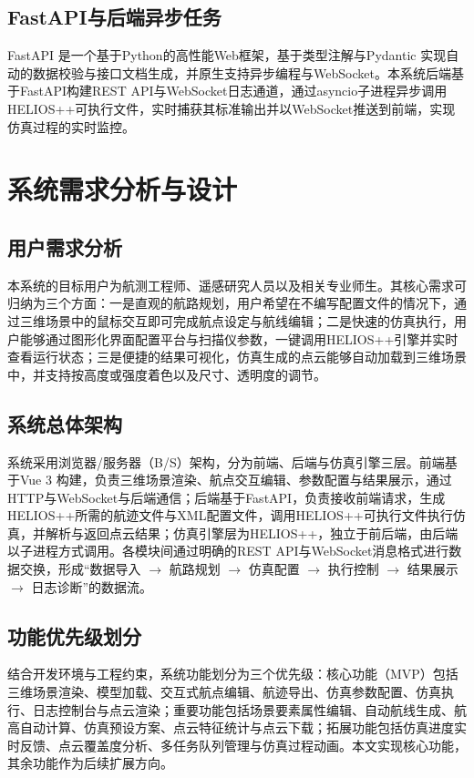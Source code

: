 \documentclass[a4paper,fleqn]{cas-sc}
\begin{document}
\subsection{FastAPI与后端异步任务}
FastAPI \citep{fastapi}是一个基于Python的高性能Web框架，基于类型注解与Pydantic \citep{pydantic} 实现自动的数据校验与接口文档生成，并原生支持异步编程与WebSocket。本系统后端基于FastAPI构建REST API与WebSocket日志通道，通过asyncio子进程异步调用HELIOS++可执行文件，实时捕获其标准输出并以WebSocket推送到前端，实现仿真过程的实时监控。

\section{系统需求分析与设计}\label{sec:design}
\subsection{用户需求分析}
本系统的目标用户为航测工程师、遥感研究人员以及相关专业师生。其核心需求可归纳为三个方面：一是直观的航路规划，用户希望在不编写配置文件的情况下，通过三维场景中的鼠标交互即可完成航点设定与航线编辑；二是快速的仿真执行，用户能够通过图形化界面配置平台与扫描仪参数，一键调用HELIOS++引擎并实时查看运行状态；三是便捷的结果可视化，仿真生成的点云能够自动加载到三维场景中，并支持按高度或强度着色以及尺寸、透明度的调节。

\subsection{系统总体架构}
系统采用浏览器/服务器（B/S）架构，分为前端、后端与仿真引擎三层。前端基于Vue 3 \citep{vuejs} 构建，负责三维场景渲染、航点交互编辑、参数配置与结果展示，通过HTTP与WebSocket与后端通信；后端基于FastAPI，负责接收前端请求，生成HELIOS++所需的航迹文件与XML配置文件，调用HELIOS++可执行文件执行仿真，并解析与返回点云结果；仿真引擎层为HELIOS++，独立于前后端，由后端以子进程方式调用。各模块间通过明确的REST API与WebSocket消息格式进行数据交换，形成“数据导入 $\rightarrow$ 航路规划 $\rightarrow$ 仿真配置 $\rightarrow$ 执行控制 $\rightarrow$ 结果展示 $\rightarrow$ 日志诊断”的数据流。

\subsection{功能优先级划分}
结合开发环境与工程约束，系统功能划分为三个优先级：核心功能（MVP）包括三维场景渲染、模型加载、交互式航点编辑、航迹导出、仿真参数配置、仿真执行、日志控制台与点云渲染；重要功能包括场景要素属性编辑、自动航线生成、航高自动计算、仿真预设方案、点云特征统计与点云下载；拓展功能包括仿真进度实时反馈、点云覆盖度分析、多任务队列管理与仿真过程动画。本文实现核心功能，其余功能作为后续扩展方向。
\end{document}
